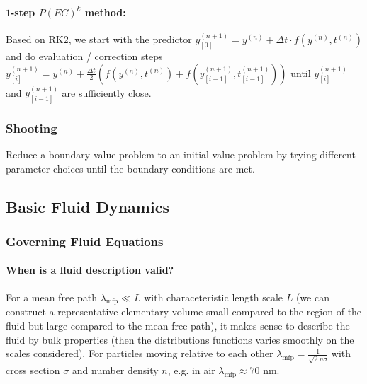 \paragraph*{$1$-step $P(EC)^k$ method:} Based on RK2, we start with the predictor $y^{(n+1)}_{[0]} = y^{(n)} + \Delta t \cdot f(y^{(n)}, t^{(n)})$ and do
evaluation / correction steps $y^{(n+1)}_{[i]} = y^{(n)} + \frac{\Delta t}{2} \left( f(y^{(n)}, t^{(n)}) + f(y^{(n+1)}_{[i-1]}, t^{(n+1)}_{[i-1]}) \right)$
until $y^{(n+1)}_{[i]}$ and $y^{(n+1)}_{[i-1]}$ are sufficiently close.

\subsubsection*{Shooting} Reduce a boundary value problem to an initial value problem by trying different 
parameter choices until the boundary conditions are met.

\subsection*{Basic Fluid Dynamics}

\subsubsection*{Governing Fluid Equations}



\paragraph*{When is a fluid description valid?} For a mean free path $\lambda_{\text{mfp}} \ll L$ with
characeteristic length scale $L$ (we can construct a representative elementary volume
small compared to the region of the fluid but large compared to the mean free path), it makes sense to describe the fluid by bulk properties (then
the distributions functions varies smoothly on the scales considered). For particles
moving relative to each other $\lambda_\text{mfp} = \frac{1}{\sqrt{2} n \sigma}$ with
cross section $\sigma$ and number density $n$, e.g. in air $\lambda_{\text{mfp}} \approx 70 \text{ nm}$.

